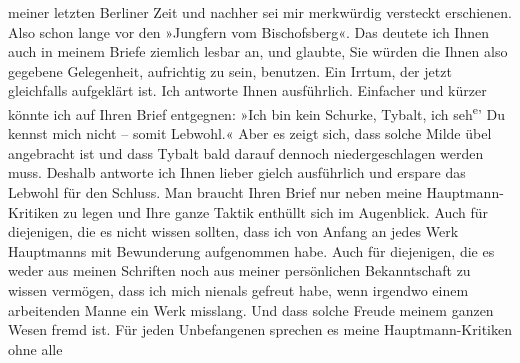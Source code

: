 \begin{ledgroupsized}[t]{13cm}
               meiner letzten Berliner Zeit und nachher sei mir
               merkwürdig versteckt erschienen. Also schon lange vor den »Jungfern vom Bischofsberg«. Das deutete ich Ihnen auch in
               meinem Briefe ziemlich lesbar an, und glaubte, Sie würden die Ihnen also gegebene
               Gelegenheit, aufrichtig zu sein, benutzen. Ein Irrtum, der jetzt gleichfalls
               aufgeklärt ist.\pend
           \pstart
           Ich antworte Ihnen ausführlich. Einfacher und kürzer {\pb}könnte ich auf Ihren Brief
               entgegnen: »Ich bin kein Schurke,
                  Tybalt, ich seh\substVorne{}\textsuperscript{e}\substDazwischen{}’\substHinten{} Du kennst mich nicht – somit Lebwohl.« Aber es zeigt sich, dass
               solche Milde übel angebracht ist und dass Tybalt bald darauf dennoch niedergeschlagen
               werden muss. Deshalb antworte ich Ihnen lieber gielch ausführlich und erspare das
               Lebwohl für den Schluss.\pend
           \pstart
           Man braucht Ihren Brief nur neben meine Hauptmann-Kritiken zu legen und Ihre
               ganze Taktik enthüllt sich im Augenblick. Auch für diejenigen, die es nicht wissen
               sollten, dass ich von Anfang an jedes Werk Hauptmanns mit Bewunderung aufgenommen habe. Auch für diejenigen, die es
               weder aus meinen Schriften noch aus meiner persönlichen Bekanntschaft zu wissen
               vermögen, dass ich mich nienals gefreut habe, wenn irgendwo einem arbeitenden Manne
               ein Werk misslang. Und dass solche Freude meinem ganzen Wesen fremd ist.\pend
           \pstart
           Für jeden Unbefangenen sprechen es meine Hauptmann-Kritiken ohne alle

\end{ledgroupsized}
